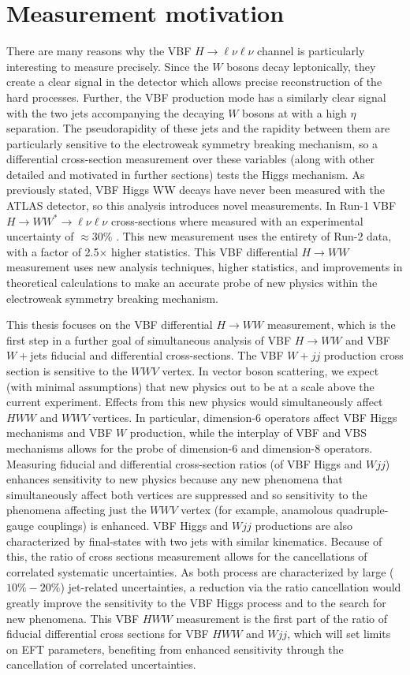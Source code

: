 \section{Measurement motivation}
There are many reasons why the VBF $H\rightarrow\ell\nu\ell\nu$ channel is particularly interesting to measure precisely. Since the $W$ bosons decay leptonically, they create a clear signal in the detector which allows precise reconstruction of the hard processes. Further, the VBF production mode has a similarly clear signal with the two jets accompanying the decaying $W$ bosons at with a high $\eta$ separation. The pseudorapidity of these jets and the rapidity between them are particularly sensitive to the electroweak symmetry breaking mechanism, so a differential cross-section measurement over these variables (along with other detailed and motivated in further sections) tests the Higgs mechanism. As previously stated, VBF Higgs WW decays have never been measured with the ATLAS detector, so this analysis introduces novel measurements. In Run-1 VBF $H\rightarrow WW^* \rightarrow \ell\nu\ell\nu$ cross-sections where measured with an experimental uncertainty of $\approx30\%$ \cite{HiggsCurrent}. This new measurement uses the entirety of Run-2 data, with a factor of 2.5$\times$ higher statistics. This VBF differential $H\rightarrow WW$ measurement uses new analysis techniques, higher statistics, and improvements in theoretical calculations to make an accurate probe of new physics within the electroweak symmetry breaking mechanism.

This thesis focuses on the VBF differential $H\rightarrow WW$ measurement, which is the first step in a further goal of simultaneous analysis of VBF $H\rightarrow WW$ and VBF $W+$jets fiducial and differential cross-sections. The VBF $W+jj$ production cross section is sensitive to the $WWV$ vertex. In vector boson scattering, we expect (with minimal assumptions) that new physics out to be at a scale above the current experiment. Effects from this new physics would simultaneously affect $HWW$ and $WWV$ vertices. In particular, dimension-6 operators affect VBF Higgs mechanisms and VBF $W$ production, while the interplay of VBF and VBS mechanisms allows for the probe of dimension-6 and dimension-8 operators. Measuring fiducial and differential cross-section ratios (of VBF Higgs and $Wjj$) enhances sensitivity to new physics because any new phenomena that simultaneously affect both vertices are suppressed and so sensitivity to the phenomena affecting just the $WWV$ vertex (for example, anamolous quadruple-gauge couplings) is enhanced.  VBF Higgs and $Wjj$ productions are also characterized by final-states with two jets with similar kinematics. Because of this, the ratio of cross sections measurement allows for the cancellations of correlated systematic uncertainties. As both process are characterized by large ($10\%-20\%$) jet-related uncertainties, a reduction via the ratio cancellation would greatly improve the sensitivity to the VBF Higgs process and to the search for new phenomena. This VBF $HWW$ measurement is the first part of the ratio of fiducial differential cross sections for VBF $HWW$ and $Wjj$, which will set limits on EFT parameters, benefiting from enhanced sensitivity through the cancellation of correlated uncertainties. 
